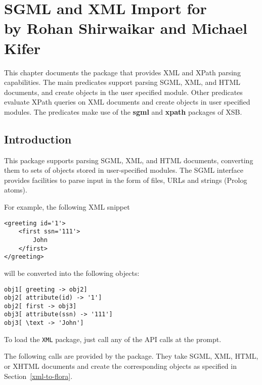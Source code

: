 \chapter[SGML and XML Parser for \FLSYSTEM]
{SGML and XML Import for \FLSYSTEM\\
  {\Large by Rohan Shirwaikar and Michael Kifer}}

This chapter documents the \FLSYSTEM package that provides XML
and XPath
parsing capabilities. The main predicates support parsing
SGML, XML, and HTML documents, and create \FLSYSTEM objects in the user
specified module.
Other predicates evaluate XPath queries
on XML documents and create \FLSYSTEM objects in user specified
modules. The predicates make use of the {\bf sgml} and {\bf xpath}
packages of XSB.



\section{Introduction}\label{sec-xml-intro}

This package supports parsing SGML, XML, and HTML documents,
converting them to sets of \FLSYSTEM objects stored in user-specified
\FLSYSTEM modules. The SGML interface
provides facilities to parse input in the form of files,
URLs and strings (Prolog atoms).  

For example, the following XML snippet

\begin{verbatim}
<greeting id='1'>
    <first ssn='111'>
        John
    </first>
</greeting>
\end{verbatim}

will be converted into the following \FLSYSTEM objects:

\begin{verbatim}
obj1[ greeting -> obj2]
obj2[ attribute(id) -> '1']
obj2[ first -> obj3]
obj3[ attribute(ssn) -> '111']
obj3[ \text -> 'John']
\end{verbatim}

To load the {\tt XML} package, just call any of the API calls
at the \FLSYSTEM prompt.

The following calls are provided by the package.  They
take SGML, XML, HTML, or XHTML documents and create the corresponding
\FLSYSTEM objects as specified in Section~\ref{xml-to-flora}.

